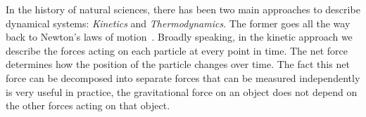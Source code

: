 


\noindent
In the history of natural sciences,
there has been two main approaches to describe dynamical systems:
\emph{Kinetics} and \emph{Thermodynamics}.
The former goes all the way back to
Newton's laws of motion~\citep{newton}.
Broadly speaking, in the kinetic approach we describe the forces
acting on each particle at every point in time.
The net force determines how
the position of the particle changes over time.
The fact this net force can be decomposed into separate forces
that can be measured independently is very useful in practice,
\eg the gravitational force on an object does not depend on
the other forces acting on that object.

